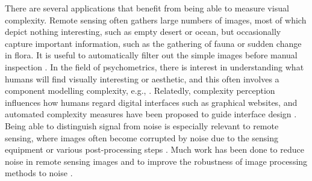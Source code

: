 \documentclass[a4paper,fleqn]{cas-sc}
\theoremstyle{remark}
\begin{document}
There are several applications that benefit from being able to measure visual complexity. Remote sensing often gathers large numbers of images, most of which depict nothing interesting, such as empty desert or ocean, but occasionally capture important information, such as the gathering of fauna or sudden change in flora. It is useful to automatically filter out the simple images before manual inspection \citep{falconer2004fractal,sun2006fractal,yang2000analysis}. In the field of psychometrics, there is interest in understanding what humans will find visually interesting or aesthetic, and this often involves a component modelling complexity, e.g., \citep{forsythe2008confounds, carballal2020comparison}. Relatedly, complexity perception influences how humans regard digital interfaces such as graphical websites, and automated complexity measures have been proposed to guide interface design \citep{stickel2010xaos}. Being able to distinguish signal from noise is especially relevant to remote sensing, where images often become corrupted by noise due to the sensing equipment or various post-processing steps
\citep{chioukh2014noise,narayanan2003effects,landgrebe1986noise}. Much work has been done to reduce noise in remote sensing images \citep{chang2016remote,rasti2018noise} and to improve the robustness of image processing methods to noise \citep{huang2020efficient,duan2019noise}.
\end{document}

